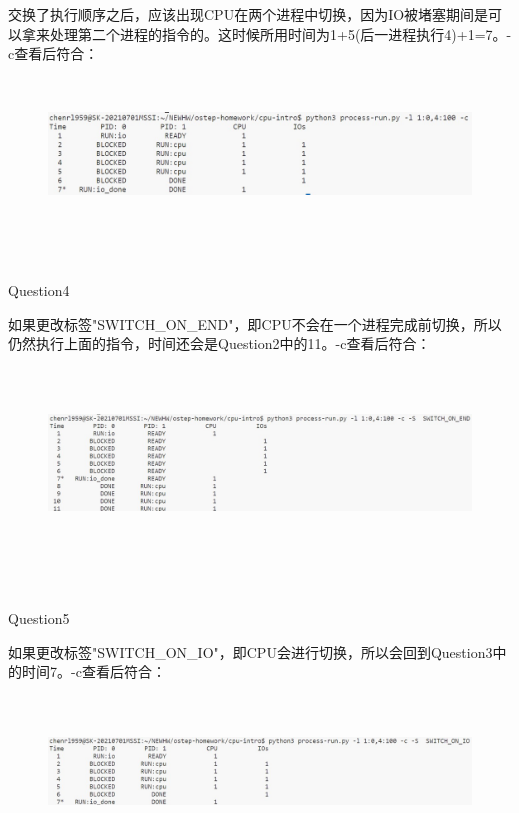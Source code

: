 \documentclass[12pt]{article}
\begin{document}
\hspace*{2em}交换了执行顺序之后，应该出现CPU在两个进程中切换，因为IO被堵塞期间是可以拿来处理第二个进程的指令的。这时候所用时间为1+5(后一进程执行4)+1=7。-c查看后符合：
\begin{figure}[h]
    \centering
    \includegraphics[height=4cm,width=13cm]{HW2-3.jpg}
\end{figure}\\
\begin{large}
    \noindent Question4\\
\end{large}
\hspace*{2em}如果更改标签"SWITCH\_ON\_END"，即CPU不会在一个进程完成前切换，所以仍然执行上面的指令，时间还会是Question2中的11。-c查看后符合：
\begin{figure}[h]
    \centering
    \includegraphics[height=5cm,width=13cm]{HW2-4.jpg}
\end{figure}\\
\begin{large}
    \noindent Question5\\
\end{large}
\hspace*{2em}如果更改标签"SWITCH\_ON\_IO"，即CPU会进行切换，所以会回到Question3中的时间7。-c查看后符合：
\begin{figure}[h]
    \centering
    \includegraphics[height=4cm,width=13cm]{HW2-5.jpg}
\end{figure}\\
\end{document}
